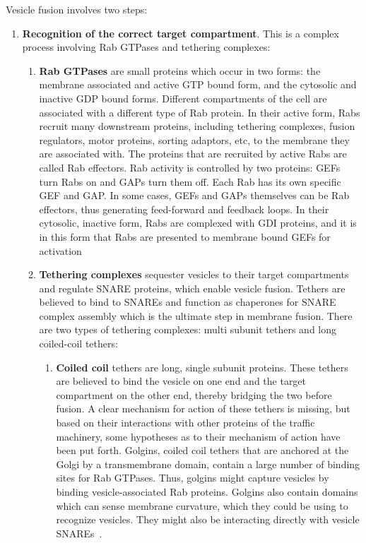 Vesicle fusion involves two steps:
\begin{enumerate}
	\item \textbf{Recognition of the correct target compartment}. 
	      This is a complex process involving Rab
	      GTPases and tethering complexes:
	    
	    \begin{enumerate}[label=(\roman*)]
	    	\item \textbf{Rab GTPases}  are small proteins which occur in two forms: the membrane associated and active
	    	GTP bound form, and the cytosolic and inactive GDP bound forms. 
	    	Different compartments of the
	    	cell are associated with a different type of Rab protein. In their active form, Rabs recruit many
	    	downstream proteins, including tethering complexes, fusion regulators, motor proteins, sorting
	    	adaptors, etc, to the membrane they are associated with. 
	    	The proteins that are recruited by active
	    	Rabs are called Rab effectors.
	    	Rab activity is controlled by two proteins: GEFs turn Rabs on and
	    	GAPs turn them off. 
	    	Each Rab has its own specific GEF and GAP. In some cases, GEFs and GAPs
	    	themselves can be Rab effectors, thus generating feed-forward and feedback loops. 
	    	In their cytosolic, inactive form, Rabs are complexed with GDI proteins, and it is in this form that Rabs are presented to membrane bound GEFs for activation~\cite{muller2018molecular}
	    	
	    	\item \textbf{Tethering complexes} sequester vesicles to their target compartments and regulate SNARE
	    	proteins, which enable vesicle fusion. 
	    	Tethers are believed to bind to SNAREs and function as
	    	chaperones for SNARE complex assembly which is the ultimate step in membrane fusion. 
	    	There are two types of tethering complexes: multi subunit tethers and long coiled-coil tethers:
	    	
	    	\begin{enumerate}[label=(\alph*)]
	    		\item \textbf{Coiled coil} tethers are long, single subunit proteins. 
	    		These tethers are believed to bind the
	    		vesicle on one end and the target compartment on the other end, thereby bridging the two before
	    		fusion.
	    		A clear mechanism for action of these tethers is missing, but based on their interactions with
	    		other proteins of the traffic machinery, some hypotheses as to their mechanism of action have been
	    		put forth. 
	    		Golgins, coiled coil tethers that are anchored at the Golgi by a transmembrane domain, contain a large number of binding sites for Rab GTPases. 
	    		Thus, golgins might capture vesicles by
	    		binding vesicle-associated Rab proteins. 
	    		Golgins also contain domains which can sense membrane
	    		curvature, which they could be using to recognize vesicles. 
	    		They might also be interacting directly
	    		with vesicle SNAREs~\cite{baker2016chaperoning}.
	    		

\end{enumerate}
\end{enumerate}
\end{enumerate}
